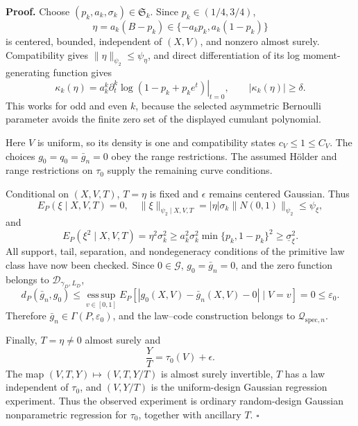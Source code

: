 \textbf{Proof.}
Choose \((p_k,a_k,\sigma_k)\in\mathfrak S_k\). Since \(p_k\in(1/4,3/4)\),
\[
 \eta=a_k(B-p_k)\in\{-a_kp_k,a_k(1-p_k)\}
\]
is centered, bounded, independent of \((X,V)\), and nonzero almost surely. Compatibility gives \(\|\eta\|_{\psi_2}\le\psi_\eta\), and direct differentiation of its log moment-generating function gives
\[
 \kappa_k(\eta)=a_k^k\left.\partial_t^k\log(1-p_k+p_ke^t)\right|_{t=0},
 \qquad |\kappa_k(\eta)|\ge\delta. \tag{1}
\]
This works for odd and even \(k\), because the selected asymmetric Bernoulli parameter avoids the finite zero set of the displayed cumulant polynomial.

Here \(V\) is uniform, so its density is one and compatibility states \(c_V\le1\le C_V\). The choices \(g_0=q_0=\bar g_n=0\) obey the range restrictions. The assumed H\"older and range restrictions on \(\tau_0\) supply the remaining curve conditions.

Conditional on \((X,V,T)\), \(T=\eta\) is fixed and \(\epsilon\) remains centered Gaussian. Thus
\[
 E_P(\xi\mid X,V,T)=0,
 \quad
 \|\xi\|_{\psi_2\mid X,V,T}
 =|\eta|\sigma_k\|N(0,1)\|_{\psi_2}
 \le\psi_\xi, \tag{2}
\]
and
\[
 E_P(\xi^2\mid X,V,T)=\eta^2\sigma_k^2
 \ge a_k^2\sigma_k^2\min\{p_k,1-p_k\}^2
 \ge\underline\sigma_\xi^2. \tag{3}
\]
All support, tail, separation, and nondegeneracy conditions of the primitive law class have now been checked. Since \(0\in\mathcal G\), \(g_0=\bar g_n=0\), and the zero function belongs to \(\mathcal D_{\gamma_D,L_D}\),
\[
 d_P(\bar g_n,g_0)
 \le \operatorname*{ess\,sup}_{v\in[0,1]}
 E_P[|g_0(X,V)-\bar g_n(X,V)-0|\mid V=v]
 =0\le\varepsilon_0. \tag{4}
\]
Therefore \(\bar g_n\in\Gamma(P,\varepsilon_0)\), and the law--code construction belongs to \(\mathcal Q_{\mathrm{spec},n}\).

Finally, \(T=\eta\ne0\) almost surely and
\[
 \frac{Y}{T}=\tau_0(V)+\epsilon. \tag{5}
\]
The map \((V,T,Y)\mapsto(V,T,Y/T)\) is almost surely invertible, \(T\) has a law independent of \(\tau_0\), and \((V,Y/T)\) is the uniform-design Gaussian regression experiment. Thus the observed experiment is ordinary random-design Gaussian nonparametric regression for \(\tau_0\), together with ancillary \(T\). \(\square\)
